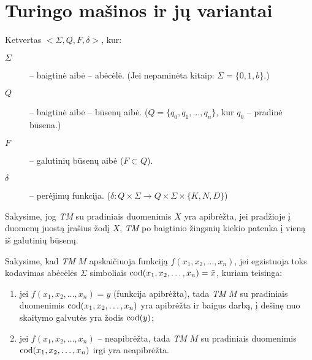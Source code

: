 \chapter{Turingo mašinos ir jų variantai}

\begin{defn}
  Ketvertas $<\Sigma,Q,F,\delta>$, kur:
  \begin{description}
    \item[$\Sigma$] – baigtinė aibė – abėcėlė. (Jei nepaminėta kitaip:
      $\Sigma = \{0, 1, b\}$.)
    \item[$Q$] – baigtinė aibė – būsenų aibė. 
      ($Q = \{q_0,q_1,\dotsc,q_n\}$, kur $q_0$ – pradinė būsena.)
    \item[$F$] – galutinių būsenų aibė ($F \subset Q$).
    \item[$\delta$] – perėjimų funkcija. 
      ($\delta: Q \times \Sigma \to Q \times \Sigma \times \{K,N,D\}$)
  \end{description}
\end{defn}

\begin{defn}
  Sakysime, jog \emph{TM} su pradiniais duomenimis $X$ yra apibrėžta, jei 
  pradžioje į duomenų juostą įrašius žodį $X$, \emph{TM} po baigtinio
  žingsnių kiekio patenka į vieną iš galutinių būsenų.
\end{defn}

\begin{defn}
  Sakysime, kad \emph{TM} $M$ apskaičiuoja funkciją 
  $f(x_1,x_2,\dotsc,x_n)$, jei egzistuoja toks kodavimas abėcėlės 
  $\Sigma$ simboliais $\operatorname{cod}(x_1,x_2,\dotsc,x_n) = \tilde{x}$, kuriam
  teisinga:
  \begin{enumerate}
    \item jei $f(x_1,x_2,\dotsc,x_n) = y$ (funkcija apibrėžta), tada 
      \emph{TM} $M$ su pradiniais duomenimis $\operatorname{cod}(x_1,x_2,\dotsc,x_n)$
      yra apibrėžta ir baigus darbą, į dešinę nuo skaitymo galvutės yra
      žodis $\operatorname{cod}(y)$;
    \item jei $f(x_1,x_2,\dotsc,x_n)$ – neapibrėžta, tada \emph{TM} $M$
      su pradiniais duomenimis $\operatorname{cod}(x_1,x_2,\dotsc,x_n)$ irgi yra
      neapibrėžta.
  \end{enumerate}
\end{defn}

